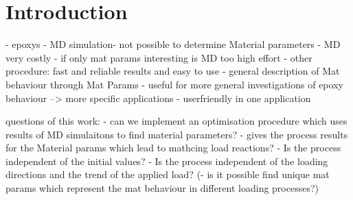 \chapter{Introduction}

- epoxys
- MD simulation- not possible to determine Material parameters
- MD very costly
- if only mat params interesting is MD too high effort
- other procedure: fast and reliable results and easy to use
- general description of Mat behaviour through Mat Params
- useful for more general investigations of epoxy behaviour --> more specific applications
- userfriendly in one application



questions of this work: 
- can we implement an optimisation procedure which uses results of MD simulaitons to find material parameters?
- gives the process results for the Material params which lead to mathcing load reactions?
- Is the process independent of the initial values?
- Is the process independent of the loading directions and the trend of the applied load?
(- is it possible find unique mat params which represent the mat behaviour in different loading processes?)
